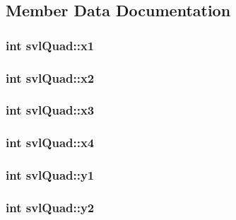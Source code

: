 \subsection{Member Data Documentation}
\hypertarget{structsvl_quad_addbddfb4d8835305e7993bc95beb5396}{
\subsubsection[{x1}]{\setlength{\rightskip}{0pt plus 5cm}int svl\-Quad\-::x1}}\label{structsvl_quad_addbddfb4d8835305e7993bc95beb5396}
\hypertarget{structsvl_quad_ad76051b0fd6671b8c7d8a789a0c0bf2b}{
\subsubsection[{x2}]{\setlength{\rightskip}{0pt plus 5cm}int svl\-Quad\-::x2}}\label{structsvl_quad_ad76051b0fd6671b8c7d8a789a0c0bf2b}
\hypertarget{structsvl_quad_ab057dbdbfeafdb523773a523d8bb3ed3}{
\subsubsection[{x3}]{\setlength{\rightskip}{0pt plus 5cm}int svl\-Quad\-::x3}}\label{structsvl_quad_ab057dbdbfeafdb523773a523d8bb3ed3}
\hypertarget{structsvl_quad_aa2161465036bb13654d38e6aa4272493}{
\subsubsection[{x4}]{\setlength{\rightskip}{0pt plus 5cm}int svl\-Quad\-::x4}}\label{structsvl_quad_aa2161465036bb13654d38e6aa4272493}
\hypertarget{structsvl_quad_a27d5a63998c61d8e3d0a6a8d49b0f867}{
\subsubsection[{y1}]{\setlength{\rightskip}{0pt plus 5cm}int svl\-Quad\-::y1}}\label{structsvl_quad_a27d5a63998c61d8e3d0a6a8d49b0f867}
\hypertarget{structsvl_quad_af793c440c3bca87d594bb157fbf7a129}{
\subsubsection[{y2}]{\setlength{\rightskip}{0pt plus 5cm}int svl\-Quad\-::y2}}\label{structsvl_quad_af793c440c3bca87d594bb157fbf7a129}
